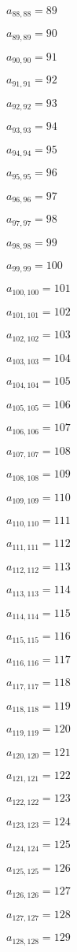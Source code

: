 \documentclass[a4paper,12pt]{article}
\begin{document}
$a _{ 88, 88 } = 89$

$a _{ 89, 89 } = 90$

$a _{ 90, 90 } = 91$

$a _{ 91, 91 } = 92$

$a _{ 92, 92 } = 93$

$a _{ 93, 93 } = 94$

$a _{ 94, 94 } = 95$

$a _{ 95, 95 } = 96$

$a _{ 96, 96 } = 97$

$a _{ 97, 97 } = 98$

$a _{ 98, 98 } = 99$

$a _{ 99, 99 } = 100$

$a _{ 100, 100 } = 101$

$a _{ 101, 101 } = 102$

$a _{ 102, 102 } = 103$

$a _{ 103, 103 } = 104$

$a _{ 104, 104 } = 105$

$a _{ 105, 105 } = 106$

$a _{ 106, 106 } = 107$

$a _{ 107, 107 } = 108$

$a _{ 108, 108 } = 109$

$a _{ 109, 109 } = 110$

$a _{ 110, 110 } = 111$

$a _{ 111, 111 } = 112$

$a _{ 112, 112 } = 113$

$a _{ 113, 113 } = 114$

$a _{ 114, 114 } = 115$

$a _{ 115, 115 } = 116$

$a _{ 116, 116 } = 117$

$a _{ 117, 117 } = 118$

$a _{ 118, 118 } = 119$

$a _{ 119, 119 } = 120$

$a _{ 120, 120 } = 121$

$a _{ 121, 121 } = 122$

$a _{ 122, 122 } = 123$

$a _{ 123, 123 } = 124$

$a _{ 124, 124 } = 125$

$a _{ 125, 125 } = 126$

$a _{ 126, 126 } = 127$

$a _{ 127, 127 } = 128$

$a _{ 128, 128 } = 129$
\end{document}
